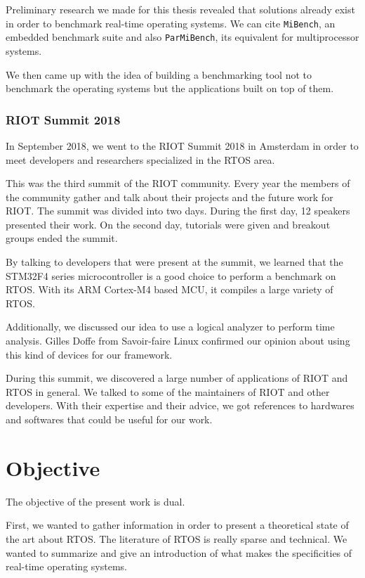 Preliminary research we made for this thesis revealed that solutions already exist in order to benchmark real-time operating systems.
We can cite \texttt{MiBench}\cite{mibench}, an embedded benchmark suite and also \texttt{ParMiBench}\cite{parmibench}, its equivalent for multiprocessor systems.

We then came up with the idea of building a benchmarking tool not to benchmark the operating systems but the applications built on top of them.

\subsubsection*{RIOT Summit 2018}
In September 2018, we went to the RIOT Summit 2018 in Amsterdam in order to meet developers and researchers specialized in the RTOS area.

This was the third summit of the RIOT community.
Every year the members of the community gather and talk about their projects and the future work for RIOT.
The summit was divided into two days. 
During the first day, 12 speakers presented their work. 
On the second day, tutorials were given and breakout groups ended the summit.

By talking to developers that were present at the summit, we learned that the STM32F4 series microcontroller is a good choice to perform a benchmark on RTOS. 
With its ARM Cortex-M4 based MCU, it compiles a large variety of RTOS.

Additionally, we discussed our idea to use a logical analyzer to perform time analysis. 
Gilles Doffe from Savoir-faire Linux confirmed our opinion about using this kind of devices for our framework.

During this summit, we discovered a large number of applications of RIOT and RTOS in general.
We talked to some of the maintainers of RIOT and other developers. 
With their expertise and their advice, we got references to hardwares and softwares that could be useful for our work.

%
%
\section*{Objective}
The objective of the present work is dual.

First, we wanted to gather information in order to present a theoretical state of the art about RTOS.
The literature of RTOS is really sparse and technical.
We wanted to summarize and give an introduction of what makes the specificities of real-time operating systems.

